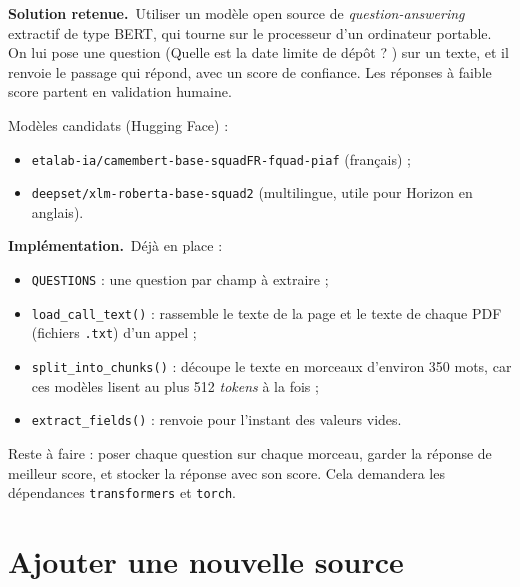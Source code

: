\documentclass[11pt,a4paper]{article}
\newcommand{\sol}{\par\medskip\noindent\textbf{\textcolor{solcolor}{Solution retenue.}}\ }
\newcommand{\impl}{\par\medskip\noindent\textbf{\textcolor{implcolor}{Implémentation.}}\ }
\newcommand{\code}[1]{\texttt{#1}}
\begin{document}
\sol Utiliser un modèle open source de \emph{question-answering} extractif de type BERT,
qui tourne sur le processeur d'un ordinateur portable. On lui pose une question
(\og Quelle est la date limite de dépôt ? \fg) sur un texte, et il renvoie le passage qui
répond, avec un score de confiance. Les réponses à faible score partent en validation humaine.

Modèles candidats (Hugging Face) :
\begin{itemize}
  \item \code{etalab-ia/camembert-base-squadFR-fquad-piaf} (français) ;
  \item \code{deepset/xlm-roberta-base-squad2} (multilingue, utile pour Horizon en anglais).
\end{itemize}

\impl Déjà en place :
\begin{itemize}
  \item \code{QUESTIONS} : une question par champ à extraire ;
  \item \code{load\_call\_text()} : rassemble le texte de la page et le texte de chaque PDF
        (fichiers \code{.txt}) d'un appel ;
  \item \code{split\_into\_chunks()} : découpe le texte en morceaux d'environ 350 mots, car
        ces modèles lisent au plus 512 \emph{tokens} à la fois ;
  \item \code{extract\_fields()} : renvoie pour l'instant des valeurs vides.
\end{itemize}

Reste à faire : poser chaque question sur chaque morceau, garder la réponse de meilleur
score, et stocker la réponse avec son score. Cela demandera les dépendances
\code{transformers} et \code{torch}.

\section{Ajouter une nouvelle source}
\end{document}

